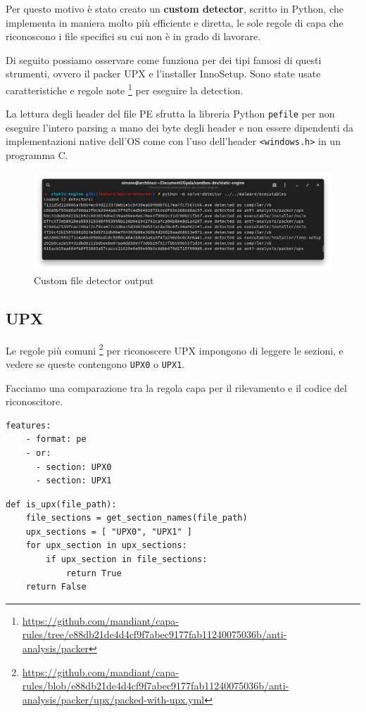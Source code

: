 Per questo motivo è stato creato un \textbf{custom detector}, scritto in Python, che implementa in maniera molto più efficiente e diretta, le sole regole di capa che riconoscono i file specifici su cui non è in grado di lavorare.

Di seguito possiamo osservare come funziona per dei tipi famosi di questi strumenti, ovvero il packer UPX e l'installer InnoSetup.
Sono state usate caratteristiche e regole note
\footnote{\url{https://github.com/mandiant/capa-rules/tree/e88db21de4d4cf9f7abec9177fab11240075036b/anti-analysis/packer}}
per eseguire la detection.

La lettura degli header del file PE sfrutta la libreria Python \texttt{pefile} per non eseguire l'intero parsing a mano dei byte degli header e non essere dipendenti da implementazioni native dell'OS come con l'uso dell'header \texttt{<windows.h>} in un programma C.

\begin{figure}[!htb]
    \centering
    \includegraphics[width=\textwidth]{assets/custom_file_detector_output.png}
    \caption{Custom file detector output}
\end{figure}

\subsection{UPX}
Le regole più comuni
\footnote{\url{https://github.com/mandiant/capa-rules/blob/e88db21de4d4cf9f7abec9177fab11240075036b/anti-analysis/packer/upx/packed-with-upx.yml}}
per riconoscere UPX impongono di leggere le sezioni, e vedere se queste contengono \texttt{UPX0} o \texttt{UPX1}.

Facciamo una comparazione tra la regola capa per il rilevamento e il codice del riconoscitore.

\noindent\begin{minipage}{.35\textwidth}
       \begin{verbatim}
features:
    - format: pe
    - or:
      - section: UPX0
      - section: UPX1
       \end{verbatim}
\end{minipage}
\begin{minipage}{.4\textwidth}
       \begin{verbatim}
def is_upx(file_path):
    file_sections = get_section_names(file_path)
    upx_sections = [ "UPX0", "UPX1" ]
    for upx_section in upx_sections:
        if upx_section in file_sections:
            return True
    return False
       \end{verbatim}
\end{minipage}

